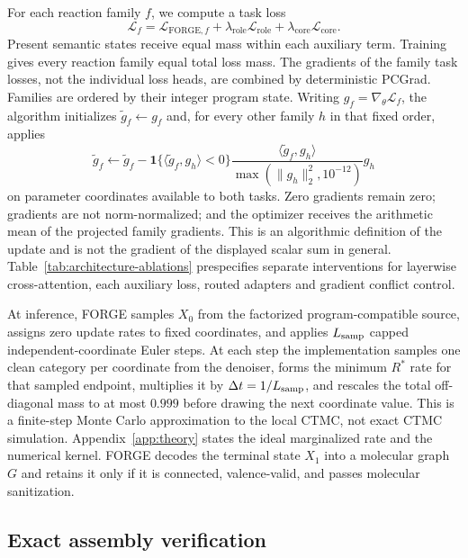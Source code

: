 \documentclass{article}
\begin{document}
For each reaction family $f$, we compute a task loss
\begin{equation}
    \mathcal L_f
    = \mathcal L_{\mathrm{FORGE},f}
    + \lambda_{\mathrm{role}}\mathcal L_{\mathrm{role}}
    + \lambda_{\mathrm{core}}\mathcal L_{\mathrm{core}}.
\end{equation}
Present semantic states receive equal mass within each auxiliary term. Training gives every reaction
family equal total loss mass. The gradients of the family task losses, not the individual loss
heads, are combined by deterministic PCGrad. Families are ordered by their integer program state.
Writing $g_f=\nabla_\theta\mathcal L_f$, the algorithm initializes
$\widetilde g_f\leftarrow g_f$ and, for every other family $h$ in that fixed order, applies
\begin{equation}
    \widetilde g_f\leftarrow
    \widetilde g_f-
    \mathbf 1\{\langle\widetilde g_f,g_h\rangle<0\}
    \frac{\langle\widetilde g_f,g_h\rangle}{\max(\lVert g_h\rVert_2^2,10^{-12})}
    g_h
\end{equation}
on parameter coordinates available to both tasks. Zero gradients remain zero; gradients are not
norm-normalized; and the optimizer receives the arithmetic mean of the projected family gradients.
This is an algorithmic definition of the update and is not the gradient of the displayed scalar
sum in general.
Table~\ref{tab:architecture-ablations} prespecifies separate interventions for layerwise
cross-attention, each auxiliary loss, routed adapters and gradient conflict control.

At inference, FORGE samples $X_0$ from the factorized program-compatible source, assigns zero update
rates to fixed coordinates, and applies $L_{\rm samp}$ capped independent-coordinate Euler steps.
At each step the implementation samples one clean category per coordinate from the denoiser, forms
the minimum $R^*$ rate for that sampled endpoint, multiplies it by
$\Delta t=1/L_{\rm samp}$, and rescales the total off-diagonal mass to at most $0.999$ before drawing
the next coordinate value. This is a finite-step Monte Carlo approximation to the local CTMC, not
exact CTMC simulation. Appendix~\ref{app:theory} states the ideal marginalized rate and the numerical
kernel.
FORGE decodes the terminal state $X_1$ into a molecular graph $G$ and retains it only if it is
connected, valence-valid, and passes molecular sanitization.

\subsection{Exact assembly verification}
\end{document}
